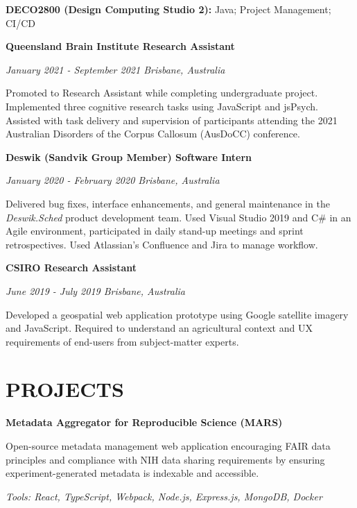 \documentclass{article}
\begin{document}
  \textbf{DECO2800 (Design Computing Studio 2):} Java; Project Management; CI/CD

  \medbreak

  {\large\textbf{Queensland Brain Institute \hfill Research Assistant}}

  \textit{January 2021 - September 2021 \hfill Brisbane, Australia}

  Promoted to Research Assistant while completing undergraduate project. Implemented three cognitive research tasks using JavaScript and jsPsych. Assisted with task delivery and supervision of participants attending the 2021 Australian Disorders of the Corpus Callosum (AusDoCC) conference.

  \pagebreak

  {\large\textbf{Deswik (Sandvik Group Member) \hfill Software Intern}}

  \textit{January 2020 - February 2020 \hfill Brisbane, Australia}

  Delivered bug fixes, interface enhancements, and general maintenance in the \textit{Deswik.Sched} product development team. Used Visual Studio 2019 and C\# in an Agile environment, participated in daily stand-up meetings and sprint retrospectives. Used Atlassian's Confluence and Jira to manage workflow.

  \medbreak

  {\large\textbf{CSIRO \hfill Research Assistant}}

  \textit{June 2019 - July 2019 \hfill Brisbane, Australia}

  Developed a geospatial web application prototype using Google satellite imagery and JavaScript. Required to understand an agricultural context and UX requirements of end-users from subject-matter experts.

  \section*{\centering\uppercase{Projects}}

  \textbf{Metadata Aggregator for Reproducible Science (MARS)}

  Open-source metadata management web application encouraging FAIR data principles and compliance with NIH data sharing requirements by ensuring experiment-generated metadata is indexable and accessible.

  \textit{Tools: React, TypeScript, Webpack, Node.js, Express.js, MongoDB, Docker}

  \medbreak
\end{document}
